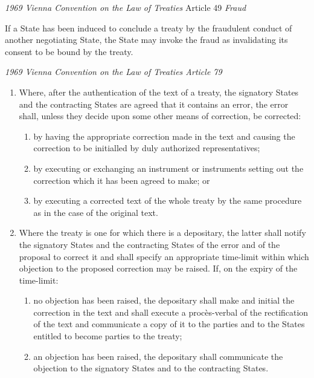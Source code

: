 \begin{conventiondetails}{\textit{1969 Vienna Convention on the Law of Treaties} Article 49}\label{VCLT Art 49}
    \flushleft
    \textit{Fraud}

    \vspace{\baselineskip}

    If a State has been induced to conclude a treaty by the fraudulent conduct of another negotiating  State, the State may invoke the fraud as invalidating its consent to be bound by the treaty.
\end{conventiondetails}

\begin{conventiondetails}{\textit{1969 Vienna Convention on the Law of Treaties Article 79}}
    \flushleft
    \begin{enumerate}
        \item Where, after the authentication of the text of a treaty, the signatory States and the contracting States are agreed that it contains an error, the error shall, unless they decide upon some other means of correction, be corrected:
        \begin{enumerate}
            \item by having the appropriate correction made in the text and causing the correction to be initialled by duly authorized representatives; 
            \item by executing or exchanging an instrument or instruments setting out the correction which it has been agreed to make; or 
            \item by executing a corrected text of the whole treaty by the same procedure as in the case of the original text.
        \end{enumerate}
        \item Where the treaty is one for which there is a depositary, the latter shall notify the signatory 
        States and the contracting States of the error and of the proposal to correct it and shall specify an appropriate time-limit within which objection to the proposed correction may be raised. If, on the expiry of the time-limit:
        \begin{enumerate}
            \item no objection has been raised, the depositary shall make and initial the correction in the text and shall execute a procès-verbal of the rectification of the text and communicate a copy of it to the parties and to the States entitled to become parties to the treaty; 
            \item an objection has been raised, the depositary shall communicate the objection to the signatory States and to the contracting States.

\end{enumerate}
\end{enumerate}
\end{conventiondetails}

